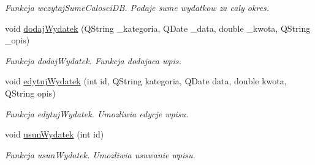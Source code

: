 \begin{DoxyCompactItemize}
\begin{DoxyCompactList}\small\item\em Funkcja wczytaj\+Sume\+Calosci\+D\+B. Podaje sume wydatkow za caly okres. \end{DoxyCompactList}\item 
void \hyperlink{class_menager_wydatkow_a30be73243e008dc5f7ab8eb669a05e55}{dodaj\+Wydatek} (Q\+String \+\_\+kategoria, Q\+Date \+\_\+data, double \+\_\+kwota, Q\+String \+\_\+opis)
\begin{DoxyCompactList}\small\item\em Funkcja dodaj\+Wydatek. Funkcja dodajaca wpis. \end{DoxyCompactList}\item 
void \hyperlink{class_menager_wydatkow_addeab8e73a7c13b9e4349892d692dfc3}{edytuj\+Wydatek} (int id, Q\+String kategoria, Q\+Date data, double kwota, Q\+String opis)
\begin{DoxyCompactList}\small\item\em Funkcja edytuj\+Wydatek. Umozliwia edycje wpisu. \end{DoxyCompactList}\item 
void \hyperlink{class_menager_wydatkow_a9aabc079d73f31d46a96148f85b9c4d7}{usun\+Wydatek} (int id)
\begin{DoxyCompactList}\small\item\em Funkcja usun\+Wydatek. Umozliwia usuwanie wpisu. \end{DoxyCompactList}\end{DoxyCompactItemize}
